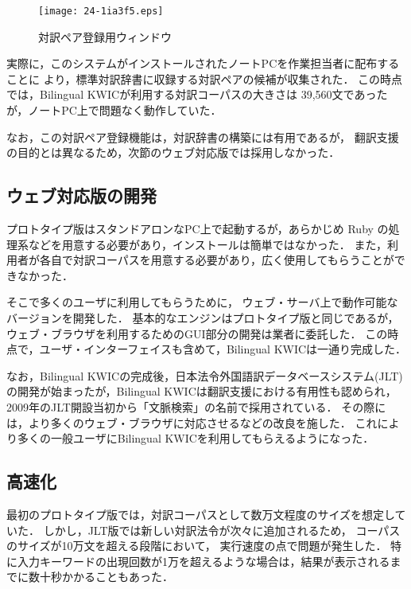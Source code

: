 \documentclass[japanese]{jnlp_1.4}
\begin{document}
\begin{figure}[b]
\begin{center}
\texttt{[image: 24-1ia3f5.eps]}
\end{center}
\caption{対訳ペア登録用ウィンドウ}
\label{fig:pop}
\end{figure}

実際に，このシステムがインストールされたノートPCを作業担当者に配布することに
より，標準対訳辞書に収録する対訳ペアの候補が収集された．
この時点では，Bilingual KWICが利用する対訳コーパスの大きさは 39,560文であったが，ノートPC上で問題なく動作していた．

なお，この対訳ペア登録機能は，対訳辞書の構築には有用であるが，
翻訳支援の目的とは異なるため，次節のウェブ対応版では採用しなかった．


\subsection{ウェブ対応版の開発}

プロトタイプ版はスタンドアロンなPC上で起動するが，あらかじめ Ruby の処理系などを用意する必要があり，インストールは簡単ではなかった．
また，利用者が各自で対訳コーパスを用意する必要があり，広く使用してもらうことができなかった．

そこで多くのユーザに利用してもらうために，
ウェブ・サーバ上で動作可能なバージョンを開発した．
基本的なエンジンはプロトタイプ版と同じであるが，
ウェブ・ブラウザを利用するためのGUI部分の開発は業者に委託した．
この時点で，ユーザ・インターフェイスも含めて，Bilingual KWICは一通り完成した．

なお，Bilingual KWICの完成後，日本法令外国語訳データベースシステム(JLT)
の開発が始まったが，Bilingual KWICは翻訳支援における有用性も認められ，
2009年のJLT開設当初から「文脈検索」の名前で採用されている．
その際には，より多くのウェブ・ブラウザに対応させるなどの改良を施した．
これにより多くの一般ユーザにBilingual KWICを利用してもらえるようになった．


\subsection{高速化}
\label{sec:high-speed}

最初のプロトタイプ版では，対訳コーパスとして数万文程度のサイズを想定していた．
しかし，JLT版では新しい対訳法令が次々に追加されるため，
コーパスのサイズが10万文を超える段階において，
実行速度の点で問題が発生した．
特に入力キーワードの出現回数が1万を超えるような場合は，結果が表示されるまでに数十秒かかることもあった．
\end{document}
